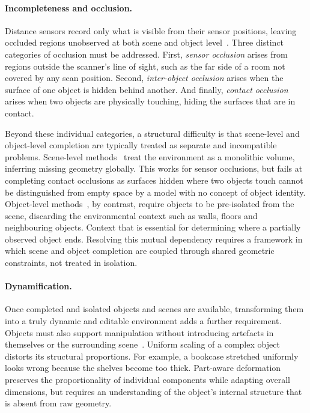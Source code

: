 \paragraph{Incompleteness and occlusion.}
Distance sensors record only what is visible from their sensor positions, leaving occluded regions unobserved at both scene and object level~\cite{vermandere_synthetic_2026, vermandere_geometry_2025}. Three distinct categories of occlusion must be addressed. First, \textit{sensor occlusion} arises from regions outside the scanner's line of sight, such as the far side of a room not covered by any scan position. Second, \textit{inter-object occlusion} arises when the surface of one object is hidden behind another. And finally, \textit{contact occlusion} arises when two objects are physically touching, hiding the surfaces that are in contact.

Beyond these individual categories, a structural difficulty is that scene-level and object-level completion are typically treated as separate and incompatible problems. Scene-level methods~\cite{hubner_voxel-based_2020, dai_scancomplete_2018, dai_spsg_2020, roldao_3d_2022} treat the environment as a monolithic volume, inferring missing geometry globally. This works for sensor occlusions, but fails at completing contact occlusions as surfaces hidden where two objects touch cannot be distinguished from empty space by a model with no concept of object identity. Object-level methods~\cite{mittal_autosdf_2022, chibane_implicit_2020, ren_xcube_2023, cheng_sdfusion_2023}, by contrast, require objects to be pre-isolated from the scene, discarding the environmental context such as walls, floors and neighbouring objects. Context that is essential for determining where a partially observed object ends. Resolving this mutual dependency requires a framework in which scene and object completion are coupled through shared geometric constraints, not treated in isolation.

\paragraph{Dynamification.}
Once completed and isolated objects and scenes are available, transforming them into a truly dynamic and editable environment adds a further requirement. Objects must also support manipulation without introducing artefacts in themselves or the surrounding scene~\cite{ardelean_gen3dsr_2025, vermandere_adaptive_2026}. Uniform scaling of a complex object distorts its structural proportions. For example, a bookcase stretched uniformly looks wrong because the shelves become too thick. Part-aware deformation preserves the proportionality of individual components while adapting overall dimensions, but requires an understanding of the object's internal structure that is absent from raw geometry.
 
